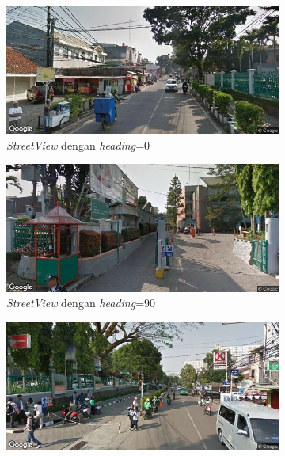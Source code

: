 \begin{figure}[]
	\begin{subfigure}{.5\textwidth}
  		\centering
  		\includegraphics[width=1\linewidth]{Gambar/streetview0.png}
  		\caption{\textit{StreetView} dengan \textit{heading}=0}
  		\label{fig:streetview0}
	\end{subfigure}
	\begin{subfigure}{.5\textwidth}
  		\centering
  		\includegraphics[width=1\linewidth]{Gambar/streetview90.png}
  		\caption{\textit{StreetView} dengan \textit{heading}=90}
  		\label{fig:streetview90}
	\end{subfigure}
	\begin{subfigure}{.5\textwidth}
  		\centering
  		\includegraphics[width=1\linewidth]{Gambar/streetview180.png}

\end{subfigure}
\end{figure}
